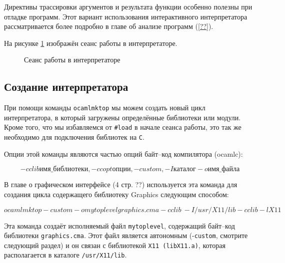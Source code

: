 Директивы трассировки аргументов и результата функции особенно полезны при
отладке программ. Этот вариант использования интерактивного интерпретатора
рассматривается более подробно в главе об анализе программ (\ref{??}).

На рисунке \ref{fig:session_with_the_toplevel_loop} изображён сеанс работы в
интерпретаторе.

\begin{figure}[h]
	\caption{\label{fig:session_with_the_toplevel_loop}Сеанс работы в
интерпретаторе}
\end{figure}

\subsection{Создание интерпретатора}

При помощи команды \texttt{ocamlmktop} мы можем создать новый цикл
интерпретатора, в который загружены определённые библиотеки или модули. Кроме
того, что мы избавляемся от \texttt{\#load} в начале сеанса работы, это так же
необходимо для подключения библиотек на \texttt{C}.

Опции этой команды являются частью опций байт--код компилятора (ocamlc):

$$
-cclib имя\_библиотеки, -ccopt опции, -custom, -I каталог -o имя\_файла
$$

В главе о графическом интерфейсе (4 стр. ??) используется эта команда для
создания цикла содержащего библиотеку Graphics следующим способом:

$$
ocamlmktop -custom -o mytoplevel graphics.cma -cclib \ -I/usr/X11/lib -cclib
-lX11
$$

Эта команда создаёт исполняемый файл \texttt{mytoplevel}, содержащий байт--код
библиотеки \texttt{graphics.cma}. Этот файл является автономным
(-\texttt{custom}, смотрите следующий раздел) и он связан с библиотекой
\texttt{X11 (libX11.a)}, которая располагается в каталоге \texttt{/usr/X11/lib}.